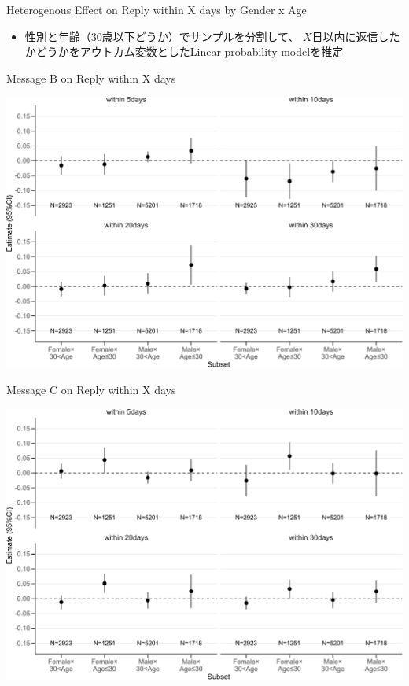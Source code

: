 \documentclass[
      aspectratio=169,
        12pt,
    ]{beamer}
\providecommand{\tightlist}{%
  \setlength{\itemsep}{0pt}\setlength{\parskip}{0pt}}
\begin{document}
\begin{frame}{Heterogenous Effect on Reply within X days by Gender x Age}
\protect\hypertarget{heterogenous-effect-on-reply-within-x-days-by-gender-x-age}{}
\begin{itemize}
\tightlist
\item
  性別と年齢（30歳以下どうか）でサンプルを分割して、
  \(X\)日以内に返信したかどうかをアウトカム変数としたLinear probability modelを推定
\end{itemize}
\end{frame}

\begin{frame}{Message B on Reply within X days}
\protect\hypertarget{message-b-on-reply-within-x-days}{}
\begin{center}\includegraphics[width=0.75\linewidth]{report_files/figure-beamer/plotB-hetero-gender-age-secondary-1} \end{center}
\end{frame}

\begin{frame}{Message C on Reply within X days}
\protect\hypertarget{message-c-on-reply-within-x-days}{}
\begin{center}\includegraphics[width=0.75\linewidth]{report_files/figure-beamer/plotC-hetero-gender-age-secondary-1} \end{center}
\end{frame}
\end{document}
